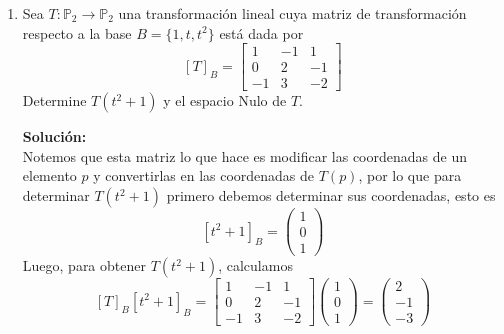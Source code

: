 \documentclass[12pt]{article}
\newenvironment{solucion}
{\begin{mdframed}[backgroundcolor=black!10]
		{\bf Solución:}\\
	}
	{
	\end{mdframed}
}
\newenvironment{preguntas}
{\begin{enumerate}\itemsep12pt
	}
	{
	\end{enumerate}
}
\newcommand{\ra}{\rightarrow}
\begin{document}
\begin{preguntas}
\begin{solucion}
Veamos ahora el $Im (T)$, que corresponde a las bases $LI$. Esto es equivalente a ver las columnas $LI$ de $A$, que ya sabemos que son todas. Por lo tanto, 
$$Im(A) = Gen\left\{\begin{pmatrix}1 \\ 0 \\ 0 \end{pmatrix},\begin{pmatrix}0 \\ 1 \\ 0 \end{pmatrix}, \begin{pmatrix}1 \\ 0 \\ 0 \end{pmatrix}\right\}$$
Luego, traduciendo estos vectores coordenadas, concluimos que
$$Im(T) = Gen\{1, x, x^2\}$$
Finalmente, las dimensiones de $Nul(T)$ y $Im(T)$ son 0 y 3, respectivamente.
\end{solucion}
\item Sea $T: \mathbb{P}_2 \ra \mathbb{P}_2$ una transformación lineal cuya matriz de transformación respecto a la base $B = \{1, t, t^2\}$ está dada por
$$[T]_B = \begin{bmatrix}
1 & -1 & 1\\
0 & 2 & -1\\
-1 & 3 & -2
\end{bmatrix}$$
Determine $T(t^2+1)$ y el espacio Nulo de $T$.
\begin{solucion}
Notemos que esta matriz lo que hace es modificar las coordenadas de un elemento $p$ y convertirlas en las coordenadas de $T(p)$, por lo que para determinar $T(t^2+1)$ primero debemos determinar sus coordenadas, esto es
$$[t^2+1]_B = \begin{pmatrix}
1 \\ 0 \\1
\end{pmatrix}$$
Luego, para obtener $T(t^2+1)$, calculamos
$$[T]_B[t^2+1]_B = \begin{bmatrix}
1 & -1 & 1\\
0 & 2 & -1\\
-1 & 3 & -2
\end{bmatrix}
\begin{pmatrix}
1 \\ 0 \\1
\end{pmatrix}
=
\begin{pmatrix}
2 \\ -1 \\ -3

\end{pmatrix}$$
\end{solucion}
\end{preguntas}
\end{document}
